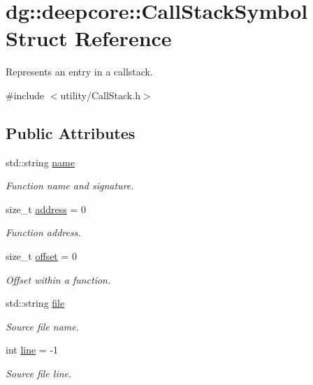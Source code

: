 \hypertarget{structdg_1_1deepcore_1_1_call_stack_symbol}{}\section{dg\+:\+:deepcore\+:\+:Call\+Stack\+Symbol Struct Reference}
\label{structdg_1_1deepcore_1_1_call_stack_symbol}


Represents an entry in a callstack.  




{\ttfamily \#include $<$utility/\+Call\+Stack.\+h$>$}

\subsection*{Public Attributes}
\begin{DoxyCompactItemize}
\item 
std\+::string \hyperlink{structdg_1_1deepcore_1_1_call_stack_symbol_a6792f8a2df6115a99a1d4fd44c6fafff}{name}
\begin{DoxyCompactList}\small\item\em Function name and signature. \end{DoxyCompactList}\item 
size\+\_\+t \hyperlink{structdg_1_1deepcore_1_1_call_stack_symbol_a017a9b54f804965736f2c5fb4ab57893}{address} = 0
\begin{DoxyCompactList}\small\item\em Function address. \end{DoxyCompactList}\item 
size\+\_\+t \hyperlink{structdg_1_1deepcore_1_1_call_stack_symbol_a47e23cb3fa667d087a9630017cc478ce}{offset} = 0
\begin{DoxyCompactList}\small\item\em Offset within a function. \end{DoxyCompactList}\item 
std\+::string \hyperlink{structdg_1_1deepcore_1_1_call_stack_symbol_a71bdd1fa76748bd2ec9b2259b773a607}{file}
\begin{DoxyCompactList}\small\item\em Source file name. \end{DoxyCompactList}\item 
int \hyperlink{structdg_1_1deepcore_1_1_call_stack_symbol_a3877758a7e10671163f02948abe725d5}{line} = -\/1
\begin{DoxyCompactList}\small\item\em Source file line. \end{DoxyCompactList}\end{DoxyCompactItemize}


